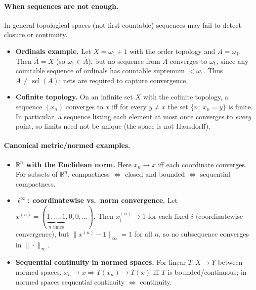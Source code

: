 \documentclass[12pt,a4paper]{article}
\theoremstyle{plain}
\theoremstyle{definition}
\theoremstyle{remark}
\theoremstyle{remark}
\begin{document}
\paragraph{When sequences are not enough.}
In general topological spaces (not first countable) sequences may fail to detect closure or continuity.

\begin{itemize}
	\item \textbf{Ordinals example.}
	Let $X=\omega_1+1$ with the order topology and $A=\omega_1$.
	Then $\overline{A}=X$ (so $\omega_1\in\overline{A}$), but no sequence from $A$ converges to $\omega_1$,
	since any countable sequence of ordinals has countable supremum $<\omega_1$.
	Thus $\overline{A}\ne \operatorname{scl}(A)$; nets are required to capture convergence.
	
	\item \textbf{Cofinite topology.}
	On an infinite set $X$ with the cofinite topology, a sequence $(x_n)$ converges to $x$ iff
	for every $y\ne x$ the set $\{n:\ x_n=y\}$ is finite.
	In particular, a sequence listing each element at most once converges to \emph{every} point,
	so limits need not be unique (the space is not Hausdorff).
\end{itemize}

\paragraph{Canonical metric/normed examples.}
\begin{itemize}
	\item \textbf{$\mathbb{R}^n$ with the Euclidean norm.}
	Here $x_n\to x$ iff each coordinate converges. For subsets of $\mathbb{R}^n$,
	compactness $\Leftrightarrow$ closed and bounded $\Leftrightarrow$ sequential compactness.
	
	\item \textbf{$\ell^\infty$: coordinatewise vs.\ norm convergence.}
	Let $x^{(n)}=(\underbrace{1,\dots,1}_{n\ \text{times}},0,0,\dots)$.
	Then $x^{(n)}_i\to 1$ for each fixed $i$ (coordinatewise convergence),
	but $\|x^{(n)}-\mathbf 1\|_\infty=1$ for all $n$, so no subsequence converges in $\|\cdot\|_\infty$.
	
	\item \textbf{Sequential continuity in normed spaces.}
	For linear $T:X\to Y$ between normed spaces, $x_n\to x \Rightarrow T(x_n)\to T(x)$
	iff $T$ is bounded/continuous; in normed spaces sequential continuity $\Leftrightarrow$ continuity.
\end{itemize}
\end{document}
